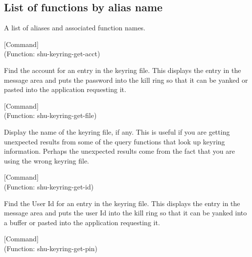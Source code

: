 \subsection{List of functions by alias name}

A list of aliases and associated function names.



\vspace{1em}
\noindent
{}
\usebox{\funcname}
 \hfill [Command]\\%
 (Function: shu-keyring-get-acct)

\begin{doc-string}
Find the account for an entry in the keyring file.  This displays the entry in the message
area and puts the password into the kill ring so that it can be yanked or pasted into the application
requesting it.
\end{doc-string}

\vspace{1em}
\noindent
{}
\usebox{\funcname}
 \hfill [Command]\\%
 (Function: shu-keyring-get-file)

\begin{doc-string}
Display the name of the keyring file, if any.  This is useful if you are
getting unexpected results from some of the query functions that look up keyring
information.  Perhaps the unexpected results come from the fact that you are
using the wrong keyring file.
\end{doc-string}

\vspace{1em}
\noindent
{}
\usebox{\funcname}
 \hfill [Command]\\%
 (Function: shu-keyring-get-id)

\begin{doc-string}
Find the User Id for an entry in the keyring file.  This displays the entry
in the message area and puts the user Id into the kill ring so that it can be
yanked into a buffer or pasted into the application requesting it.
\end{doc-string}

\vspace{1em}
\noindent
{}
\usebox{\funcname}
 \hfill [Command]\\%
 (Function: shu-keyring-get-pin)


